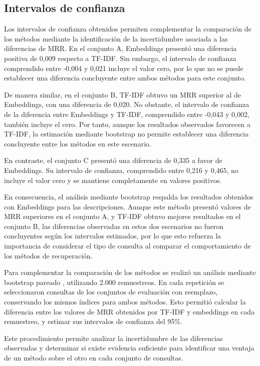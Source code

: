 \subsection{Intervalos de confianza}

Los intervalos de confianza obtenidos permiten complementar la comparación de los métodos mediante la identificación de la incertidumbre asociada a las diferencias de MRR. En el conjunto A, Embeddings presentó una diferencia positiva de 0,009 respecto a TF-IDF. Sin embargo, el intervalo de confianza comprendido entre -0,004 y 0,021 incluye el valor cero, por lo que no se puede establecer una diferencia concluyente entre ambos métodos para este conjunto.

De manera similar, en el conjunto B, TF-IDF obtuvo un MRR superior al de Embeddings, con una diferencia de 0,020. No obstante, el intervalo de confianza de la diferencia entre Embeddings y TF-IDF, comprendido entre -0,043 y 0,002, también incluye el cero. Por tanto, aunque los resultados observados favorecen a TF-IDF, la estimación mediante bootstrap no permite establecer una diferencia concluyente entre los métodos en este escenario.

En contraste, el conjunto C presentó una diferencia de 0,335 a favor de Embeddings. Su intervalo de confianza, comprendido entre 0,216 y 0,465, no incluye el valor cero y se mantiene completamente en valores positivos.

En consecuencia, el análisis mediante bootstrap respalda los resultados obtenidos con Embeddings para las descripciones. Aunque este método presentó valores de MRR superiores en el conjunto A, y TF-IDF obtuvo mejores resultados en el conjunto B, las diferencias observadas en estos dos escenarios no fueron concluyentes según los intervalos estimados, por lo que esto refuerza la importancia de considerar el tipo de consulta al comparar el comportamiento de los métodos de recuperación.

Para complementar la comparación de los métodos se realizó un análisis mediante bootstrap pareado \cite{efron1979bootstrap,efron1993bootstrap}, utilizando 2.000 remuestreos. En cada repetición se seleccionaron consultas de los conjuntos de evaluación con reemplazo, conservando los mismos índices para ambos métodos. Esto permitió calcular la diferencia entre los valores de MRR obtenidos por TF-IDF y embeddings en cada remuestreo, y estimar sus intervalos de confianza del 95\%.

Este procedimiento permite analizar la incertidumbre de las diferencias observadas y determinar si existe evidencia suficiente para identificar una ventaja de un método sobre el otro en cada conjunto de consultas.

